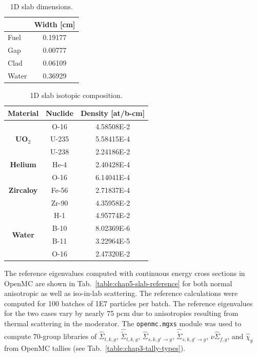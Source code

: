 \begin{table}[h!]
  \centering
  \caption[1D slab dimensions]{1D slab dimensions.}
  \small
  \label{table:chap5-slab-widths} 
  \vspace{6pt}
  \begin{tabular}{l c}
  \toprule
  \rowcolor{lightgray}
  \multicolumn{1}{c}{\bf Material} &
  \multicolumn{1}{c}{\bf Width [cm]} \\
  \midrule
  Fuel &  0.19177 \\
  Gap &   0.00777 \\
  Clad &  0.06109 \\
  Water & 0.36929 \\
  \bottomrule
\end{tabular}
\end{table}

\begin{table}[h!]
  \centering
  \caption[1D slab isotopic composition]{1D slab isotopic composition.}
  \small
  \label{table:chap5-slab-isotopes} 
  \vspace{6pt}
  \begin{tabular}{c c c}
  \toprule
  \rowcolor{lightgray}
  {\bf Material} &
  {\bf Nuclide} &
  {\bf Density [at/b-cm]} \\
  \midrule
  \multirow{3}{*}{\bf UO$_2$} & O-16 &  4.58508E-2 \\
  & U-235 & 5.58415E-4 \\
  & U-238 & 2.24186E-2 \\
  \midrule
  \multirow{1}{*}{\bf Helium} & He-4 & 2.40428E-4 \\
  \midrule
  \multirow{3}{*}{\bf Zircaloy} & O-16 &  6.14041E-4 \\
  & Fe-56 & 2.71837E-4 \\
  & Zr-90 & 4.35958E-2 \\
  \midrule
  \multirow{4}{*}{\bf Water} & H-1 &  4.95774E-2 \\
  & B-10 & 8.02369E-6 \\
  & B-11 & 3.22964E-5 \\
  & O-16 & 2.47320E-2 \\
  \bottomrule
\end{tabular}
\end{table}

The reference eigenvalues computed with continuous energy cross sections in OpenMC are shown in Tab.~\ref{table:chap5-slab-reference} for both normal anisotropic as well as iso-in-lab scattering. The reference calculations were computed for 100 batches of 1E7 particles per batch. The reference eigenvalues for the two cases vary by nearly 75 \ac{pcm} due to anisotropies resulting from thermal scattering in the moderator. The \texttt{openmc.mgxs} module was used to compute 70-group libraries of $\hat{\Sigma}_{t,k,g}$, $\hat{\tilde{\Sigma}}_{t,k,g}$, $\hat{\Sigma}_{s,k,g'\rightarrow g}$, $\hat{\tilde{\Sigma}}_{s,k,g'\rightarrow g}$, $\nu\hat{\Sigma}_{f,g}$, and $\hat{\chi}_{g}$ from OpenMC tallies (see Tab.~\ref{table:chap3-tally-types}).

